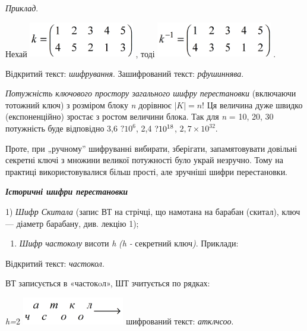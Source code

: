 \textit{Приклад}. 

Нехай  
\includegraphics[width=1.8071in,height=0.598in]{crypt-img/crypt-img60.png} , 
тоді  
\includegraphics[width=1.9835in,height=0.5992in]{crypt-img/crypt-img61.png} .

Відкритий текст: \textit{шифрування}. Зашифрований текст: \textit{рфушиннява}. 

\textit{Потужність ключового простору загального шифру перестановки} (включаючи
тотожний ключ) з розміром блоку \textit{n}\textit{ }дорівнює  $|K|=n$!  Ця
величина дуже швидко (експоненційно)  зростає з ростом величини блока. Так для 
\textit{n}\textit{ }= 10, 20, 30  потужність буде відповідно 3,6
$?\text{10}^6$,  2,4 $?\text{10}^{\text18}$,   ${2,7\times
\text{10}^{\text{32}}}$.

 Проте, при „ручному” шифруванні  вибирати,  зберігати,
запам{\textquotesingle}ятовувати довільні  секретні  ключі з множини великої
потужності було украй незручно.  Тому на практиці використовувалися більш
прості, але зручніші шифри перестановки.


\bigskip


\bigskip

{\centering\bfseries\itshape
Історичні шифри перестановки
\par}


\bigskip


\bigskip

1) \textit{Шифр Скитала} (запис ВТ на стрічці, що намотана на барабан (скитал),
ключ --- діаметр барабану, див. лекцію 1);

\liststyleWWviiiNumxli
\begin{enumerate}
\item \textit{Шифр частоколу} висоти \textit{h}\textit{ }\textit{(}\textit{h
}\textit{{}- }секретний\textit{ }ключ\textit{)}. Приклади:
\end{enumerate}
Відкритий текст: \textit{частокол}. 

ВТ записується в «частокoл», ШТ зчитується по рядках:

{\centering
\textit{h}\textit{=}2\textit{  }
\includegraphics[width=1.7598in,height=0.4681in]{crypt-img/crypt-img62.png} 
шифрований текст: \textit{атклчсоо}.
\par}

